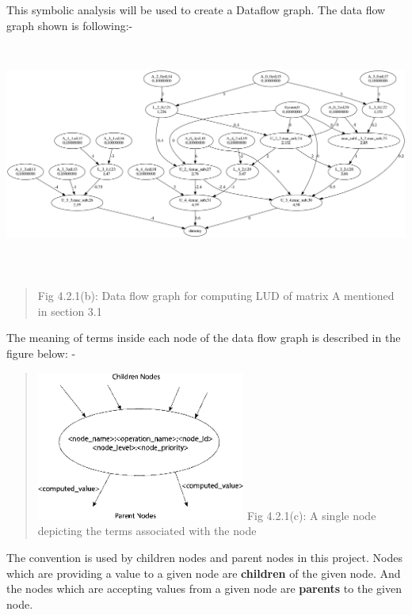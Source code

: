 This symbolic analysis will be used to create a Dataflow graph. The data flow graph shown is following:-
\includegraphics[width=7.5in,height=3.16043in]{./Scheduler/media/image44.png}
\begin{quote}
Fig 4.2.1(b): Data flow graph for computing LUD of matrix A mentioned in
section 3.1
\end{quote}

The meaning of terms inside each node of the data flow graph is described in the figure below: -

\begin{quote}
\includegraphics[width=2.70278in,height=1.9408in]{./Scheduler/media/image45.png}
Fig 4.2.1(c): A single node depicting the terms associated with the node
\end{quote}

The convention is used by children nodes and parent nodes in this
project. Nodes which are providing a value to a given node are \textbf{children} of the given node. And the nodes which are accepting values from a given node are \textbf{parents} to the given
node.

